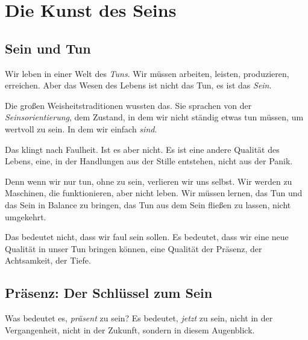 
\chapter{Die Kunst des Seins}

\section{Sein und Tun}

Wir leben in einer Welt des \emph{Tuns}. Wir müssen arbeiten, leisten, produzieren, erreichen. Aber das Wesen des Lebens ist nicht das Tun, es ist das \emph{Sein}.

Die großen Weisheitstraditionen wussten das. Sie sprachen von der \emph{Seinsorientierung}, dem Zustand, in dem wir nicht ständig etwas tun müssen, um wertvoll zu sein. In dem wir einfach \emph{sind}.

Das klingt nach Faulheit. Ist es aber nicht. Es ist eine andere Qualität des Lebens, eine, in der Handlungen aus der Stille entstehen, nicht aus der Panik.

Denn wenn wir nur tun, ohne zu sein, verlieren wir uns selbst. Wir werden zu Maschinen, die funktionieren, aber nicht leben. Wir müssen lernen, das Tun und das Sein in Balance zu bringen, das Tun aus dem Sein fließen zu lassen, nicht umgekehrt.

Das bedeutet nicht, dass wir faul sein sollen. Es bedeutet, dass wir eine neue Qualität in unser Tun bringen können, eine Qualität der Präsenz, der Achtsamkeit, der Tiefe.

\section{Präsenz: Der Schlüssel zum Sein}

Was bedeutet es, \emph{präsent} zu sein? Es bedeutet, \emph{jetzt} zu sein, nicht in der Vergangenheit, nicht in der Zukunft, sondern in diesem Augenblick.

